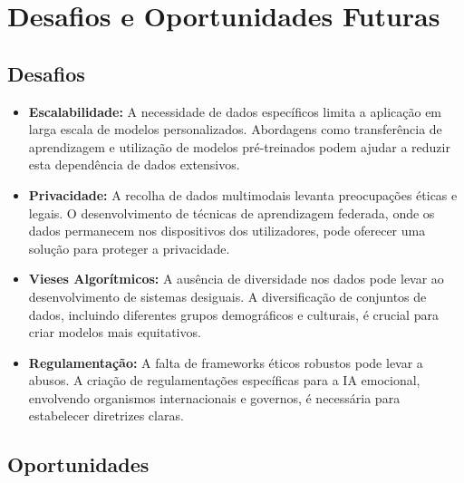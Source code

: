 \documentclass[a4paper,12pt]{report}
\begin{document}
	\section{Desafios e Oportunidades Futuras}
	
	\subsection{Desafios}
	
	\begin{itemize}
		\item \textbf{Escalabilidade:} A necessidade de dados específicos limita a aplicação em larga escala de modelos personalizados. Abordagens como transferência de aprendizagem e utilização de modelos pré-treinados podem ajudar a reduzir esta dependência de dados extensivos.
		\item \textbf{Privacidade:} A recolha de dados multimodais levanta preocupações éticas e legais. O desenvolvimento de técnicas de aprendizagem federada, onde os dados permanecem nos dispositivos dos utilizadores, pode oferecer uma solução para proteger a privacidade.
		\item \textbf{Vieses Algorítmicos:} A ausência de diversidade nos dados pode levar ao desenvolvimento de sistemas desiguais. A diversificação de conjuntos de dados, incluindo diferentes grupos demográficos e culturais, é crucial para criar modelos mais equitativos.
		\item \textbf{Regulamentação:} A falta de frameworks éticos robustos pode levar a abusos. A criação de regulamentações específicas para a IA emocional, envolvendo organismos internacionais e governos, é necessária para estabelecer diretrizes claras.
	\end{itemize}
	
	\subsection{Oportunidades}
	
\end{document}
